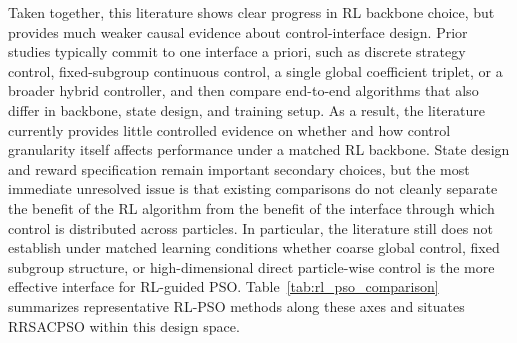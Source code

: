 \documentclass[final,5p,times]{elsarticle}
\def\small{}%
\begin{document}
Taken together, this literature shows clear progress in RL backbone choice, but provides much weaker causal evidence about control-interface design.
Prior studies typically commit to one interface a priori, such as discrete strategy control, fixed-subgroup continuous control, a single global coefficient triplet, or a broader hybrid controller, and then compare end-to-end algorithms that also differ in backbone, state design, and training setup.
As a result, the literature currently provides little controlled evidence on whether and how control granularity itself affects performance under a matched RL backbone.
State design and reward specification remain important secondary choices, but the most immediate unresolved issue is that existing comparisons do not cleanly separate the benefit of the RL algorithm from the benefit of the interface through which control is distributed across particles.
In particular, the literature still does not establish under matched learning conditions whether coarse global control, fixed subgroup structure, or high-dimensional direct particle-wise control is the more effective interface for RL-guided PSO.
Table~\ref{tab:rl_pso_comparison} summarizes representative RL-PSO methods along these axes and situates RRSACPSO within this design space.
\begin{table}[htbp]
\centering
\small
\caption{Representative RL-based PSO parameter-control methods, organized by control granularity and state design. The comparison highlights that prior methods usually fix the control interface rather than compare control granularities under a matched RL backbone.}
\label{tab:rl_pso_comparison}
\end{table}
\end{document}
